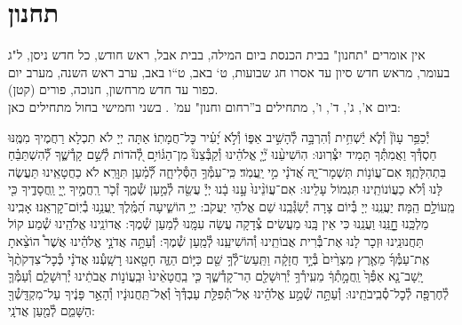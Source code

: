 \documentclass[twoside, openany, parskip=half, 11pt]{book}
\begin{document}
\nextpage


\section[תחנון]{ תחנון }
\label{tachanun mon thurs}
\begin{scriptsize}

\textsf{
אין אומרים "תחנון" בבית הכנסת ביום המילה, בבית אבל, ראש חודש, כל חדש ניסן, ל"ג בעומר, מראש חדש סיון עד אסרו חג שבועות, ט` באב, ט``ו באב, ערב ראש השנה, מערב יום כפור עד חדש מרחשון, חנוכה, פורים (קטן).\\
ביום א', ג', ד', ו', מתחילים ב''רחום וחנון" עמ'
\pageref{nefilas_apayim}.
בשני וחמישי בחול מתחילים כאן:
}

\end{scriptsize}

יְ֯כַפֵּ֥ר עָוֹן֘ וְ֯לֹ֢א יַ֫שְׁחִ֥ית וְ֯הִרְבָּ֣ה לְ֯הָשִׁ֣יב אַפּ֑וֹ וְ֯לֹ֣א יָ֝עִ֗יר כׇּל־חֲמָתֽוֹ׃ אַתָּה יְיָ לֹא תִכְלָא רַחֲמֶיךָ מִמֶּֽנּוּ חַסְדְּ֯ךָ וַאֲמִתְּ֯ךָ תָּמִיד יִצְּ֯רֽוּנוּ: הֽוֹשִׁיעֵ֨נוּ יְ֘יָ֤ אֱלֹהֵ֗ינוּ וְ֯קַבְּ֯צֵנוּ֘ מִן־הַגּ֫וֹיִ֥ם לְ֭֯הֹדוֹת לְ֯שֵׁ֣ם קָדְ֯שֶׁ֑ךָ לְ֝֯הִשְׁתַּבֵּ֗חַ בִּתְהִלָּתֶֽךָ׃
אִם־עֲוֹנ֥וֹת תִּשְׁמָר־יָ֑הּ אֲ֝דֹנָ֗י מִ֣י יַֽעֲמֹֽד׃ כִּֽי־עִמְּ֯ךָ֥ הַסְּ֯לִיחָ֑ה לְ֝֯מַ֗עַן תִּוָּרֵֽא׃ לֹא כַחֲטָאֵֽינוּ תַּעֲשֶׂה לָּנוּ וְ֯לֹא כַעֲוֹנוֹתֵֽינוּ תִּגְמוֹל עָלֵינוּ:
אִם־עֲוֹנֵ֨ינוּ֙ עָ֣נוּ בָ֔נוּ יְיָ֕ עֲשֵׂ֖ה לְ֯מַ֣עַן שְׁ֯מֶ֑ךָ זְ֯כֹ֤ר רַֽחֲמֶ֣יךָ יְ֖יָ וַֽחֲסָדֶ֑יךָ כִּ֖י מֵֽעוֹלָ֣ם הֵֽמָּה׃ יַעֲנֵֽנוּ יְיָ בְּ֯יוֹם צָרָה יְ֯שַׂגְּ֯בֵֽנוּ שֵׁם אֱלֹהֵי יַעֲקֹב:
יְיָ֥ הוֹשִׁ֑יעָה הַ֝מֶּֽ֗לֶךְ יַֽעֲנֵ֥נוּ בְ֯יֽוֹם־קׇרְאֵֽנוּ׃
אָבִֽינוּ מַלְכֵּֽנוּ חׇׇׇׇׇׇנֵּֽנוּ וַעֲנֵֽנוּ כִּי אֵין בָּֽנוּ מַעֲשִׂים צְ֯דָקָה עֲשֵׂה עִמָּֽנוּ לְ֯מַעַן שְׁ֯מֶךָ:
אֲדוֹנֵֽינוּ אֱלֹהֵֽינוּ שְׁ֯מַע קוֹל תַּחֲנוּנֵֽינוּ וּזְכָר לָנוּ אֶת־בְּ֯רִית אֲבוֹתֵֽינוּ וְ֯הוֹשִׁיעֵֽנוּ לְ֯מַֽעַן שְׁ֯מֶךָ:
וְ֯עַתָּ֣ה אֲדֹנָ֣י אֱלֹהֵ֗ינוּ אֲשֶׁר֩ הוֹצֵ֨אתָ אֶֽת־עַמְּ֯ךָ֜ מֵאֶ֤רֶץ מִצְרַ֨יִם֙ בְּ֯יָ֣ד חֲזָקָ֔ה וַתַּֽעַשׂ־לְ֯ךָ֥ שֵׁ֖ם כַּיּ֣וֹם הַזֶּ֑ה חָטָ֖אנוּ רָשָֽׁעְ֯נוּ׃
אֲדֹנָ֗י כְּ֯כׇל־צִדְקֹתֶ֨ךָ֙ יָֽשָׁב־נָ֤א אַפְּ֯ךָ֙ וַֽחֲמָ֣תְ֯ךָ֔ מֵעִֽירְ֯ךָ֥ יְ֯רֽוּשָׁלַ֖ם הַר־קָדְ֯שֶׁ֑ךָ כִּ֤י בַֽחֲטָאֵ֨ינוּ֙ וּבַֽעֲוֹנ֣וֹת אֲבֹתֵ֔ינוּ יְ֯רֽוּשָׁלַ֧ם וְ֯עַמְּ֯ךָ֛ לְ֯חֶרְפָּ֖ה לְ֯כׇל־סְ֯בִֽיבֹתֵֽינוּ:
וְ֯עַתָּ֣ה שְׁ֯מַ֣ע אֱלֹהֵ֗ינוּ אֶל־תְּ֯פִלַּ֤ת עַבְדְּ֯ךָ֙ וְ֯אֶל־תַּֽחֲנוּנָ֔יו וְ֯הָאֵ֣ר פָּנֶ֔יךָ עַל־מִקְדָּֽשְׁ֯ךָ֖ הַשָּׁמֵ֑ם לְ֯מַ֖עַן אֲדֹנָֽי:
\end{document}
